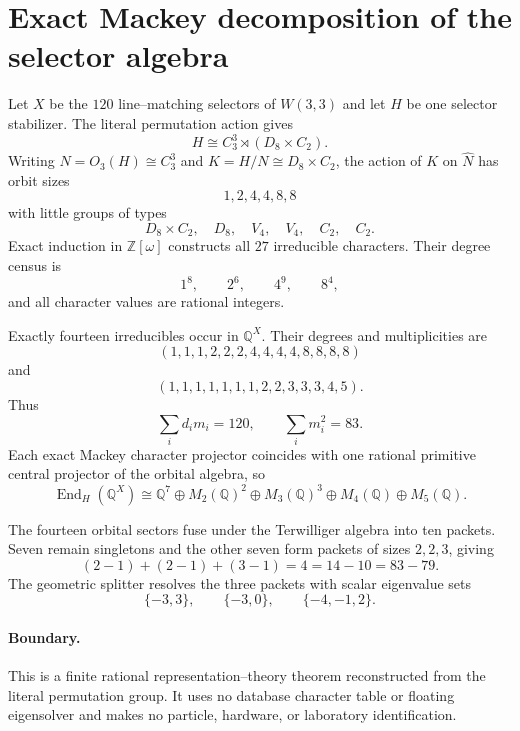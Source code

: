 \section{Exact Mackey decomposition of the selector algebra}
\label{sec:mackey-selector-decomposition}

Let $X$ be the $120$ line--matching selectors of $W(3,3)$ and let $H$ be one selector stabilizer.  The literal permutation action gives
\[
H\cong C_3^3\rtimes(D_8\times C_2).
\]
Writing $N=O_3(H)\cong C_3^3$ and $K=H/N\cong D_8\times C_2$, the action of $K$ on $\widehat N$ has orbit sizes
\[
1,2,4,4,8,8
\]
with little groups of types
\[
D_8\times C_2,\quad D_8,\quad V_4,\quad V_4,\quad C_2,\quad C_2.
\]
Exact induction in $\mathbb Z[\omega]$ constructs all $27$ irreducible characters.  Their degree census is
\[
1^8,\qquad2^6,\qquad4^9,\qquad8^4,
\]
and all character values are rational integers.

Exactly fourteen irreducibles occur in $\mathbb Q^X$.  Their degrees and multiplicities are
\[
(1,1,1,2,2,2,4,4,4,4,8,8,8,8)
\]
and
\[
(1,1,1,1,1,1,1,2,2,3,3,3,4,5).
\]
Thus
\[
\sum_i d_i m_i=120,
\qquad
\sum_i m_i^2=83.
\]
Each exact Mackey character projector coincides with one rational primitive central projector of the orbital algebra, so
\[
\operatorname{End}_H(\mathbb Q^X)
\cong
\mathbb Q^7\oplus M_2(\mathbb Q)^2\oplus
M_3(\mathbb Q)^3\oplus M_4(\mathbb Q)\oplus M_5(\mathbb Q).
\]

The fourteen orbital sectors fuse under the Terwilliger algebra into ten packets. Seven remain singletons and the other seven form packets of sizes $2,2,3$, giving
\[
(2-1)+(2-1)+(3-1)=4=14-10=83-79.
\]
The geometric splitter resolves the three packets with scalar eigenvalue sets
\[
\{-3,3\},\qquad\{-3,0\},\qquad\{-4,-1,2\}.
\]

\paragraph{Boundary.}
This is a finite rational representation--theory theorem reconstructed from the literal permutation group. It uses no database character table or floating eigensolver and makes no particle, hardware, or laboratory identification.
